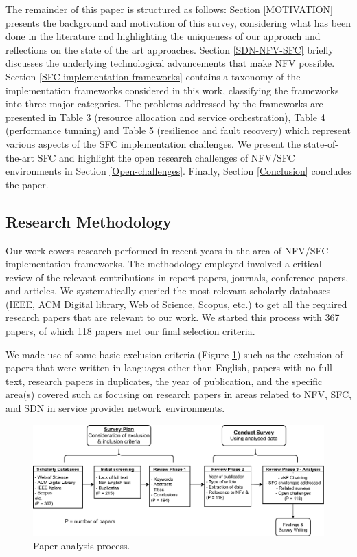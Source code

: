 \documentclass[futureinternet,review,accept,pdftex,moreauthors]{Definitions/mdpi}
\begin{document}
The remainder of this paper is structured as follows: Section \ref{MOTIVATION} presents the background and motivation of this survey, considering what has been done in the literature and  highlighting the uniqueness of our approach and reflections on the state of the art approaches. %
Section 
\ref{SDN-NFV-SFC} briefly discusses the underlying technological advancements that make NFV possible. Section
\ref{SFC implementation frameworks} contains a taxonomy of the implementation frameworks considered in this work, classifying the frameworks into three major categories. The problems addressed by the frameworks are presented in {Table} 3 (resource allocation and service orchestration),  {Table} 4 (performance tunning) and {Table} 5 (resilience and fault recovery)  which represent various aspects of the SFC implementation challenges. We present the state-of-the-art SFC and highlight the open research challenges of NFV/SFC environments in Section \ref{Open-challenges}. Finally, Section \ref{Conclusion} concludes the paper.



\subsection*{Research Methodology}
\label{methodology}
Our work covers research performed in recent years in the area of NFV/SFC implementation frameworks. The methodology employed involved a critical review of the relevant contributions in report papers, journals, conference papers, and articles. We systematically queried the most relevant scholarly databases (IEEE, ACM Digital library, Web of Science, Scopus, etc.) to get all the required research papers that are relevant to our work. We started this process with 367 papers, of which 118 papers met our final selection criteria. 

We made use of some basic exclusion criteria (Figure \ref{Data_Extraction-pic}) such as the exclusion of papers that were written in languages other than English, papers with no full text, research papers in duplicates, the year of publication, and the specific area(s) covered such as focusing on research papers in areas related to NFV, SFC, and SDN in service provider network~environments. 

\begin{figure}[H]%
\includegraphics[width=.95\columnwidth]{Data_Extraction.pdf}
\caption{Paper analysis process.}
\label{Data_Extraction-pic}
\end{figure}
\end{document}
